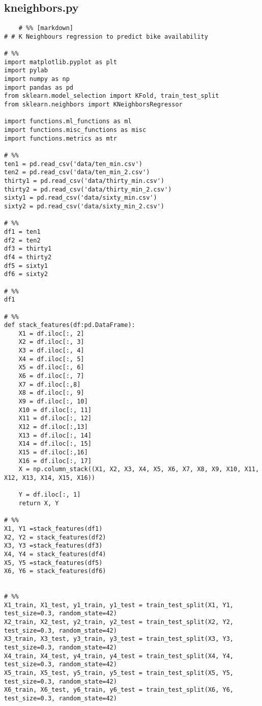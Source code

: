 \subsection{kneighbors.py}
\begin{verbatim}
    # %% [markdown]
# # K Neighbours regression to predict bike availability

# %%
import matplotlib.pyplot as plt
import pylab
import numpy as np
import pandas as pd
from sklearn.model_selection import KFold, train_test_split
from sklearn.neighbors import KNeighborsRegressor

import functions.ml_functions as ml
import functions.misc_functions as misc
import functions.metrics as mtr

# %%
ten1 = pd.read_csv('data/ten_min.csv')
ten2 = pd.read_csv('data/ten_min_2.csv')
thirty1 = pd.read_csv('data/thirty_min.csv')
thirty2 = pd.read_csv('data/thirty_min_2.csv')
sixty1 = pd.read_csv('data/sixty_min.csv')
sixty2 = pd.read_csv('data/sixty_min_2.csv')

# %%
df1 = ten1
df2 = ten2
df3 = thirty1
df4 = thirty2
df5 = sixty1
df6 = sixty2

# %%
df1

# %%
def stack_features(df:pd.DataFrame):
    X1 = df.iloc[:, 2]
    X2 = df.iloc[:, 3]
    X3 = df.iloc[:, 4]
    X4 = df.iloc[:, 5]
    X5 = df.iloc[:, 6]
    X6 = df.iloc[:, 7]
    X7 = df.iloc[:,8]
    X8 = df.iloc[:, 9]
    X9 = df.iloc[:, 10]
    X10 = df.iloc[:, 11]
    X11 = df.iloc[:, 12]
    X12 = df.iloc[:,13]
    X13 = df.iloc[:, 14]
    X14 = df.iloc[:, 15]
    X15 = df.iloc[:,16]
    X16 = df.iloc[:, 17]
    X = np.column_stack((X1, X2, X3, X4, X5, X6, X7, X8, X9, X10, X11, X12, X13, X14, X15, X16))

    Y = df.iloc[:, 1]
    return X, Y

# %%
X1, Y1 =stack_features(df1) 
X2, Y2 = stack_features(df2)
X3, Y3 =stack_features(df3) 
X4, Y4 = stack_features(df4)
X5, Y5 =stack_features(df5) 
X6, Y6 = stack_features(df6)


# %%
X1_train, X1_test, y1_train, y1_test = train_test_split(X1, Y1, test_size=0.3, random_state=42)
X2_train, X2_test, y2_train, y2_test = train_test_split(X2, Y2, test_size=0.3, random_state=42)
X3_train, X3_test, y3_train, y3_test = train_test_split(X3, Y3, test_size=0.3, random_state=42)
X4_train, X4_test, y4_train, y4_test = train_test_split(X4, Y4, test_size=0.3, random_state=42)
X5_train, X5_test, y5_train, y5_test = train_test_split(X5, Y5, test_size=0.3, random_state=42)
X6_train, X6_test, y6_train, y6_test = train_test_split(X6, Y6, test_size=0.3, random_state=42)


\end{verbatim}
